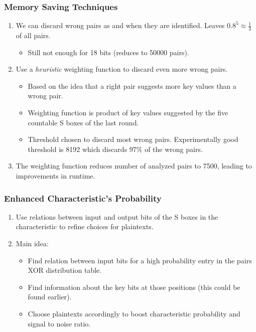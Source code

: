 \documentclass{beamer}
\begin{document}
    \begin{frame}
        \frametitle{Memory Saving Techniques}
        \begin{enumerate}
            \item<1-> We can discard wrong pairs as and when they are
            identified. Leaves \(0.8^5 \approx \frac{1}{3}\) of all pairs.
            \begin{itemize}
                \item<2-> Still not enough for 18 bits (reduces to 50000 pairs).
            \end{itemize} 
            \item<3-> Use a \emph{heuristic} weighting function to discard even
            more wrong pairs.
            \begin{itemize}
                \item<4-> Based on the idea that a right pair suggests more key
                values than a wrong pair.
                \item<5-> Weighting function is product of key values suggested
                by the five countable S boxes of the last round.
                \item<6-> Threshold chosen to discard most wrong pairs.
                Experimentally good threshold is 8192 which discards 97\% of the
                wrong pairs.
            \end{itemize}
            \item<7-> The weighting function reduces number of analyzed pairs to
            7500, leading to improvements in runtime.
        \end{enumerate}
    \end{frame}

    \begin{frame}
        \frametitle{Enhanced Characteristic's Probability}
        \begin{enumerate}
            \item<1-> Use relations between input and output bits of the S boxes
            in the characteristic to refine choices for plaintexts.
            \item<2-> Main idea:
            \begin{itemize}
                \item Find relation between input bits for a high probability
                entry in the pairs XOR distribution table.
                \item Find information about the key bits at those positions
                (this could be found earlier).
                \item Choose plaintexts accordingly to boost characteristic
                probability and signal to noise ratio.
            \end{itemize}
        \end{enumerate}
    \end{frame}
\end{document}
